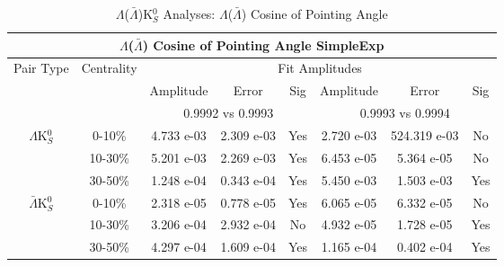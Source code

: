\documentclass[../AnalysisNoteJBuxton.tex]{subfiles}
\begin{document}
\begin{table}
 \centering
 \begin{tabular}{|c|c|c|c|c||c|c|c|}
  \multicolumn{8}{c}{$\Lambda$($\bar{\Lambda}$) Cosine of Pointing Angle SimpleExp} \\
  \hline
  \multirow{3}{*}{Pair Type} & \multirow{3}{*}{Centrality} & \multicolumn{6}{c|}{Fit Amplitudes} \\
  \cline{3-8}
   & & Amplitude & Error & Sig & Amplitude & Error & Sig \\  
  \cline{3-8}
   & & \multicolumn{3}{c||}{0.9992 vs 0.9993} & \multicolumn{3}{c|}{0.9993 vs 0.9994} \\  
  \hline  
  \multirow{3}{*}{$\Lambda$K$^{0}_{S}$}  
   &  0-10\% & 4.733 e-03 & 2.309 e-03 & Yes & 2.720 e-03 & 524.319 e-03 & No \\
   & 10-30\% & 5.201 e-03 & 2.269 e-03 & Yes & 6.453 e-05 & 5.364 e-05 & No \\
   & 30-50\% & 1.248 e-04 & 0.343 e-04 & Yes & 5.450 e-03 & 1.503 e-03 & Yes \\
  \hline  
  \multirow{3}{*}{$\bar{\Lambda}$K$^{0}_{S}$}  
   &  0-10\% & 2.318 e-05 & 0.778 e-05 & Yes & 6.065 e-05 & 6.332 e-05 & No \\
   & 10-30\% & 3.206 e-04 & 2.932 e-04 & No & 4.932 e-05 & 1.728 e-05 & Yes \\
   & 30-50\% & 4.297 e-04 & 1.609 e-04 & Yes & 1.165 e-04 & 0.402 e-04 & Yes \\
  \hline
 \end{tabular}
 \caption{$\Lambda$($\bar{\Lambda}$)K$^{0}_{S}$ Analyses: $\Lambda$($\bar{\Lambda}$) Cosine of Pointing Angle}
 \label{tab:LamCosPointingAngleLamK0_SimpleExp}
\end{table}
\end{document}
